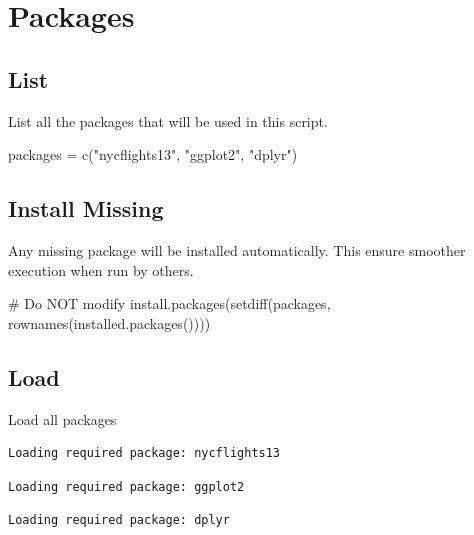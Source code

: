 \documentclass[
  letterpaper,
  DIV=11,
  numbers=noendperiod]{scrreprt}
\newenvironment{Shaded}{\begin{snugshade}}{\end{snugshade}}
\newcommand{\CommentTok}[1]{\textcolor[rgb]{0.37,0.37,0.37}{#1}}
\newcommand{\FunctionTok}[1]{\textcolor[rgb]{0.28,0.35,0.67}{#1}}
\newcommand{\NormalTok}[1]{\textcolor[rgb]{0.00,0.23,0.31}{#1}}
\newcommand{\OtherTok}[1]{\textcolor[rgb]{0.00,0.23,0.31}{#1}}
\newcommand{\StringTok}[1]{\textcolor[rgb]{0.13,0.47,0.30}{#1}}
\begin{document}
\section{Packages}\label{sec-packages}

\subsection{List}\label{list-3}

List all the packages that will be used in this script.

\begin{Shaded}
\begin{Highlighting}[]
\NormalTok{packages }\OtherTok{=} \FunctionTok{c}\NormalTok{(}\StringTok{"nycflights13"}\NormalTok{, }\StringTok{"ggplot2"}\NormalTok{, }\StringTok{"dplyr"}\NormalTok{)}
\end{Highlighting}
\end{Shaded}

\subsection{Install Missing}\label{install-missing-3}

Any missing package will be installed automatically. This ensure
smoother execution when run by others.

\begin{Shaded}
\begin{Highlighting}[]
\CommentTok{\# Do NOT modify}
\FunctionTok{install.packages}\NormalTok{(}\FunctionTok{setdiff}\NormalTok{(packages, }\FunctionTok{rownames}\NormalTok{(}\FunctionTok{installed.packages}\NormalTok{())))}
\end{Highlighting}
\end{Shaded}

\subsection{Load}\label{load-3}

Load all packages

\begin{verbatim}
Loading required package: nycflights13
\end{verbatim}

\begin{verbatim}
Loading required package: ggplot2
\end{verbatim}

\begin{verbatim}
Loading required package: dplyr
\end{verbatim}
\end{document}
